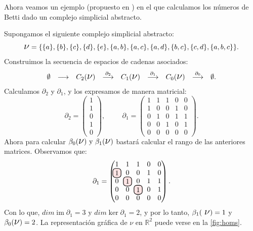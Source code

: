 \documentclass[12pt, a4paper, twoside]{book}
\newcommand\hlightr[1]{\tikz[overlay, remember picture,baseline=-
\the\dimexpr\fontdimen22\textfont2\relax]\node[rectangle,fill=red!50,rounded 
corners,fill opacity = 0.2,draw,thick,text opacity =1] {$#1$};}
\numberwithin{equation}{section}
\theoremstyle{definition}
\newenvironment{ejem}
  {\pushQED{\qed}\renewcommand{\qedsymbol}{$\blacktriangleleft$}\ejemplo}
  {\popQED\endejemplo}
\theoremstyle{remark}
\theoremstyle{plain}
\DeclareMathOperator{\Ima}{im}
\begin{document}
	Ahora veamos un ejemplo (propuesto en \cite{Intro-Otter}) en el que calculamos 
	los números de Betti dado un complejo simplicial abstracto.

	\begin{ejem}
		Supongamos el siguiente complejo simplicial abstracto:
		\begin{equation*} 
			\text{{\Large $\nu$}}=\{\{a\},\{b\},\{c\},\{d\},\{e\},
			\{a,b\},\{a,c\},\{a,d\},\{b,c\},\{c,d\},\{a,b,c\}\}.
		\end{equation*}
		Construimos la secuencia de espacios de cadenas asociados:
		\begin{equation*}
			 \left.
			\begin{array}{ccccccccc}
				\emptyset & 
				\longrightarrow & C_{2}(
				\text{{\Large $\nu$}}) & 
				\overset{\partial_{2}}{
				\longrightarrow} & C_{1}(\text{{\Large $\nu$}}) 
						& \overset{\partial_{1}}{
				\longrightarrow} 
				& C_{0}(\text{{\Large $\nu$}}) & 
				\overset{\partial_{0}}{
				\longrightarrow} & \emptyset. 
			\end{array}
			\right. 
		\end{equation*}
		Calculamos $\partial_{2}$ y $\partial_{1}$, y los expresamos 
		de manera matricial:
		\begin{equation*}
			\partial_{2}=
			\begin{pmatrix}
			1 \\
			1 \\
			0 \\
			1 \\
			0
			\end{pmatrix},
			\hspace{1cm}
			\partial_{1}=
			\begin{pmatrix}
			1 & 1 & 1 & 0 & 0\\
			1 & 0 & 0 & 1 & 0\\
			0 & 1 & 0 & 1 & 1\\
			0 & 0 & 1 & 0 & 1\\
			0 & 0 & 0 & 0 & 0
			\end{pmatrix}.
		\end{equation*}
		Ahora para calcular $\beta_{0}(\text{{\Large $\nu$}}) 
		\text{ y } \beta_{1}(\text{{\Large $\nu$}})$ bastará
		calcular el rango de las anteriores matrices. Observamos que:
		\begin{equation*}
			\partial_{1}=
			\begin{pmatrix}
			1 & 1 & 1 & 0 & 0\\
			\hlightr{1} & 0 & 0 & 1 & 0\\
			0 & \hlightr{1} & 0 & 1 & 1\\
			0 & 0 & \hlightr{1} & 0 & 1\\
			0 & 0 & 0 & 0 & 0
			\end{pmatrix}.
		\end{equation*}
		Con lo que, $dim \Ima \partial_{1}=3 \text{ y } 
		dim \ker \partial_{1}=2$, y por lo tanto, $\beta_{1}(\text{
		{\Large $\nu$}})=1$ y $\beta_{0}(\text{{\Large $\nu$}})=2$. La
		representación gráfica de {\Large $\nu$} en $\mathbb{R}^{2}$
		puede verse en la \autoref{fig:homs}.
		

\end{ejem}
\end{document}

